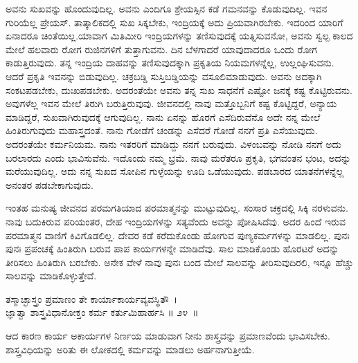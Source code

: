 ಅವನು ಸುಖವನ್ನು ಹೊಂದುವುದಿಲ್ಲ. ಅವನು ಎಂದಿಗೂ ಶ್ರೇಯಸ್ಸಿನ ಕಡೆ ಗಮನವನ್ನು ಕೊಡುವುದಿಲ್ಲ. ಇವನ ಗುರಿಯೆಲ್ಲ ಪ್ರೇಯಸ್. ತಾತ್ಕಾಲಿಕದಲ್ಲಿ ಸುಖ ಸಿಕ್ಕಬೇಕು, ಇಂದ್ರಿಯಕ್ಕೆ ಅದು ಪ್ರಿಯವಾಗಿರಬೇಕು. ಇದರಿಂದ ಯಾರಿಗೆ ಏನಾದರೂ ಚಿಂತೆಯಿಲ್ಲ.\break ಯಾವಾಗ ಮಿತಿಮೀರಿ ಇಂದ್ರಿಯಗಳನ್ನು ತಣಿಸುವುದಕ್ಕೆ ಯತ್ನಿಸುವನೋ, ಅವನು ಸ್ವಲ್ಪ ಕಾಲದ ಮೇಲೆ ಹಲವಾರು ರೋಗ ರುಜಿನಗಳಿಗೆ ತುತ್ತಾಗುವನು. ದಿನ ಬೆಳಗಾದರೆ ಯಾವುದಾದರೂ ಒಂದು ರೋಗ ಕಾಡುತ್ತಿರುವುದು. ತನ್ನ ಇಂದ್ರಿಯ ದಾಹವನ್ನು ತಣಿಸುವುದಕ್ಕಾಗಿ ಪ್ರಕೃತಿಯ ನಿಯಮಗಳನ್ನೆಲ್ಲ, ಉಲ್ಲಂಘಿಸುವನು. ಆದರೆ ಪ್ರಕೃತಿ ಇವನನ್ನು ಬಿಡುವುದಿಲ್ಲ. ಚಕ್ರಬಡ್ಡಿ ಸುಸ್ತಿಬಡ್ಡಿಯನ್ನು ವಸೂಲಿಮಾಡುವುದು. ಅವನು ಅದಕ್ಕಾಗಿ ಸಂಕಟಪಡಬೇಕು, ದುಃಖಪಡಬೇಕು. ಅದರಂತೆಯೇ ಅವನು ತನ್ನ ಸುಖ ಸಾಧನೆಗೆ ಎಷ್ಟೋ ಜನಕ್ಕೆ ಕಷ್ಟ ಕೊಟ್ಟಿರುವನು. ಅವುಗಳೆಲ್ಲ ಇವನ ಮೇಲೆ ತಿರುಗಿ ಬರುತ್ತಿರುವುವು. ಜೀವನದಲ್ಲಿ ನಾವು ಮತ್ತೊಬ್ಬನಿಗೆ ಕಷ್ಟ ಕೊಟ್ಟಿದ್ದರೆ, ಅನ್ಯಾಯ ಮಾಡಿದ್ದರೆ, ಸುಖವಾಗಿರುವುದಕ್ಕೆ ಆಗುವುದಿಲ್ಲ. ನಾನು ಏನನ್ನು ಹೊರಗೆ ಎಸೆದಿರುವೆನೊ ಅದೇ ನನ್ನ ಮೇಲೆ ಹಿಂತಿರುಗುವುದು ಮಹಾಸ್ತ್ರದಂತೆ. ನಾನು ಗೋಡೆಗೆ ಚಂಡನ್ನು ಎಸೆದರೆ ಗೋಡೆ ನನಗೆ ಪ್ರತಿ ಎಸೆಯುವುದು. ಅದರಂತೆಯೇ ಕರ್ಮನಿಯಮ. ನಾನು ಇತರರಿಗೆ ಮಾಡಿದ್ದು ನನಗೆ ಬರುವುದು. ವಿಳಂಬವನ್ನು ನೋಡಿ ನನಗೆ ಅದು ಬರಲಾರದು ಎಂದು ಭಾವಿಸುವೆನು. ಇದೊಂದು ನಮ್ಮ ಭ್ರಮೆ. ನಾವು ಮರೆತರೂ ಪ್ರಕೃತಿ, ಭಗವಂತನ ಭಂಟ, ಅದನ್ನು ಮರೆಯುವುದಿಲ್ಲ. ಅದು ನನ್ನ ಸುಖದ ಸೋಪಿನ ಗುಳ್ಳೆಯನ್ನು ಊದಿ ಒಡೆಯುವುದು. ಪಡಬಾರದ ಯಾತನೆಗಳನ್ನೆಲ್ಲ ಅನಂತರ ಪಡಬೇಕಾಗುವುದು.

ಇಂತಹ ಮನುಷ್ಯ ಜೀವನದ ಪರಮಗತಿಯಾದ ಪರಮಾತ್ಮನನ್ನು ಮುಟ್ಟುವುದಿಲ್ಲ. ಸಂಸಾರ ಚಕ್ರದಲ್ಲಿ ಸಿಕ್ಕಿ ನರಳುವನು. ನಾವು ಬದುಕಿರುವ ಪರಿಯಂತರ, ದೇಹ ಇಂದ್ರಿಯಗಳನ್ನು ಸತ್ಯವೆಂದು ಅವನ್ನು ಪೋಷಿಸಿದೆವು. ಅದರ ಹಿಂದೆ ಇರುವ ಪರಮಾತ್ಮನ ವಾಣಿಗೆ ಕಿವಿಗೊಡಲಿಲ್ಲ. ದೇವರ ಕಡೆ ಕರೆದುಕೊಂಡು ಹೋಗುವ ಪುಣ್ಯಕರ್ಮಗಳನ್ನು ಮಾಡಲಿಲ್ಲ. ಪುನಃ ಪುನಃ ಪ್ರಪಂಚಕ್ಕೆ ಹಿಂತಿರುಗಿ ಬರುವ ಪಾಪ ಕಾರ್ಯಗಳನ್ನೇ ಮಾಡಿದೆವು. ಸಾಲ ಮಾಡಿಕೊಂಡು ಹೊರಟರೆ ಅದನ್ನು ತೀರಿಸಲು ಹಿಂತಿರುಗಿ ಬರಬೇಕು. ಅನೇಕ ವೇಳೆ ನಾವು ಪುನಃ ಬಂದ ಮೇಲೆ ಸಾಲವನ್ನು ತೀರಿಸುವುದಿರಲಿ, ಇನ್ನೂ ಹೆಚ್ಚು ಸಾಲವನ್ನು ಮಾಡಿಕೊಳ್ಳುತ್ತೇವೆ.

\begin{shloka}
ತಸ್ಮಾಚ್ಛಾಸ್ತ್ರಂ ಪ್ರಮಾಣಂ ತೇ ಕಾರ್ಯಾಕಾರ್ಯವ್ಯವಸ್ಥಿತೌ~।\\ಜ್ಞಾತ್ವಾ ಶಾಸ್ತ್ರವಿಧಾನೋಕ್ತಂ ಕರ್ಮ ಕರ್ತುಮಿಹಾರ್ಹಸಿ \hfill॥ ೨೪~॥
\end{shloka}

\begin{artha}
ಆದ ಕಾರಣ ಕಾರ್ಯ ಅಕಾರ್ಯಗಳ ನಿರ್ಣಯ ಮಾಡುವಾಗ ನೀನು ಶಾಸ್ತ್ರವನ್ನು ಪ್ರಮಾಣವೆಂದು ಭಾವಿಸಬೇಕು. ಶಾಸ್ತ್ರವಿಧಿಯನ್ನು ಅರಿತು ಈ ಲೋಕದಲ್ಲಿ ಕರ್ಮವನ್ನು ಮಾಡಲು ಅರ್ಹನಾಗುತ್ತೀಯೆ.
\end{artha}

